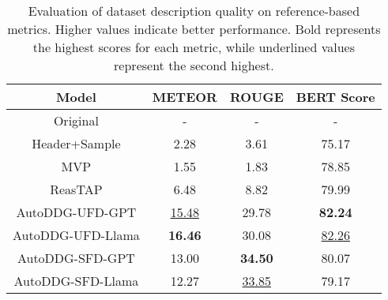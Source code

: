 \begin{table}
\begin{center}
  \begin{tabular}{c|ccc}
    \hline
    \bf Model & \bf METEOR & \bf ROUGE & \bf BERT Score \\
    \hline
    Original & - & - & - \\
    \hline
    Header+Sample & 2.28 & 3.61 & 75.17\\
    MVP & 1.55 & 1.83 & 78.85 \\
    ReasTAP & 6.48 & 8.82 & 79.99 \\
    \hline
    AutoDDG-UFD-GPT & \underline{15.48} & 29.78 & \bf 82.24 \\
    AutoDDG-UFD-Llama & \bf 16.46 & 30.08 & \underline{82.26} \\
    AutoDDG-SFD-GPT & 13.00 & \bf 34.50 & 80.07 \\
    AutoDDG-SFD-Llama & 12.27 & \underline{33.85} & 79.17 \\
  \hline
\end{tabular}
\end{center}
\caption{Evaluation of dataset description quality on reference-based metrics. Higher values indicate better performance. Bold represents the highest scores for each metric, while underlined values represent the second highest.}
  \label{tab:eval_reference_based}
\vspace{-.77cm}
\end{table}




